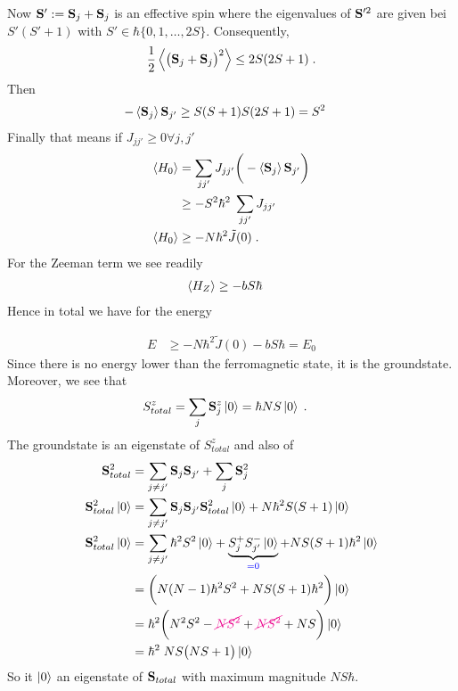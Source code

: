 Now $\mathbf S' :=\mathbf S_{j} + \mathbf S_{j}$ is an effective spin where the eigenvalues of
$\mathbf S'^{2}$ are given bei $S'(S'+1)$ with $S'\in \hbar \{0,1,\ldots,2 S\}$.
Consequently,
%
\begin{align*}
\frac{1}{2}\left\langle\big( \mathbf S_{j} + \mathbf S_{j} \big)^{2}\right\rangle \le 2S(2S+1)\;.
\end{align*}
%
Then
%
\begin{align*}
- \left\langle\mathbf S_{j}\right\rangle \mathbf S_{j'} &\ge S(S+1)  S(2S+1) = S^{2}
\end{align*}
%
Finally that means if $J_{jj'}\ge 0 \forall j,j'$
%
\begin{align*}
\left\langle H_{0}\right\rangle &= \sum_{jj'} J_{jj'} \bigg(-\left\langle\mathbf S_{j}\right\rangle \mathbf S_{j'}\bigg) \\
&\ge -S^{2}\hbar^{2}\;\sum_{jj'} J_{jj'}\\
\left\langle H_{0}\right\rangle &\ge - N \hbar^{2} \tilde J(0)\;.
\end{align*}
%
For the Zeeman term we see readily
%
\begin{align*}
\left\langle H_{Z}\right\rangle &\ge  - b S\hbar 
\end{align*}
%
Hence in total we have for the energy

%
\begin{align*}
E &\ge - N \hbar^{2} \tilde J(0) - b S\hbar = E_{0}
\end{align*}
%
Since there is no energy lower than the ferromagnetic state, it is the groundstate.
Moreover, we see that 
%
\begin{align*}
S^{z}_{total} &=\sum_{j} \mathbf S_{j}^{z}\ket{0} = \hbar NS \ket{0}\;.
\end{align*}
%
The groundstate is an eigenstate of $S^{z}_{total}$ and also of
%
\begin{align*}
\mathbf S_{total}^{2} &=\sum_{j\ne j'} \mathbf S_{j} \mathbf S_{j'} + \sum_{j} \mathbf S_{j}^{2}\\
\mathbf S_{total}^{2}\ket{0} &=\sum_{j\ne j'} \mathbf S_{j} \mathbf S_{j'}\mathbf S_{total}^{2}\ket{0} + N 
\hbar^{2}S(S+1)\ket{0}\\
\mathbf S_{total}^{2}\ket{0} &=\sum_{j\ne j'} \hbar^{2}S^{2} \ket{0} + \underbrace{
S_{j}^{+} S_{j'}^{-} \ket{0}
}_{\color{blue} = 0} + NS(S+1)\hbar^{2} \ket{0}\\
&=\bigg( N(N-1)\hbar^{2} S^{2} +  NS(S+1)\hbar^{2}\bigg)\ket{0}\\
&=\hbar^{2}\bigg( N^{2} S^{2} - {\color{magenta} \cancel{N  S^{2}}} +  {\color{magenta} \cancel{N S^{2}}} + NS \bigg)\ket{0}\\
&=\hbar^{2}\; N S\big(NS+1  \big) \ket{0}
\end{align*}
%
So it $\ket{0}$ an eigenstate of $\mathbf S_{total}$ with maximum magnitude $NS\hbar$.

